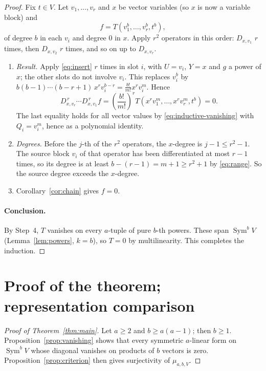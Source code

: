 \documentclass[11pt]{article}
\theoremstyle{remark}
\DeclareMathOperator{\Sym}{Sym}
\newcommand{\D}[2]{D_{#1,#2}}
\begin{document}
\begin{proof}
Fix $t\in V$. Let $v_1,\ldots,v_r$ and $x$ be vector variables (so $x$ is now
a variable block) and
\[
 f=T(v_1^b,\ldots,v_r^b,t^b),
\]
of degree $b$ in each $v_i$ and degree $0$ in $x$. Apply $r^2$ operators in
this order: $\D{x}{v_1}$ $r$ times, then $\D{x}{v_2}$ $r$ times, and so on up
to $\D{x}{v_r}$.
\begin{enumerate}[label=(\alph*),nosep]
\item \emph{Result.} Apply \eqref{eq:insert} $r$ times in slot $i$, with
$U=v_i$, $Y=x$ and $g$ a power of $x$; the other slots do not involve $v_i$.
This replaces $v_i^b$ by
$b(b-1)\cdots(b-r+1)\,x^rv_i^{b-r}=\frac{b!}{m!}x^rv_i^m$. Hence
\begin{equation}\label{eq:second-composition}
 \D{x}{v_r}^{\,r}\cdots\D{x}{v_1}^{\,r}f
 =\left(\frac{b!}{m!}\right)^r
 T(x^rv_1^m,\ldots,x^rv_r^m,t^b)=0.
\end{equation}
The last equality holds for all vector values by
\eqref{eq:inductive-vanishing} with $Q_i=v_i^m$, hence as a polynomial
identity.
\item \emph{Degrees.} Before the $j$-th of the $r^2$ operators, the
$x$-degree is $j-1\le r^2-1$. The source block $v_i$ of that operator has
been differentiated at most $r-1$ times, so its degree is at least
$b-(r-1)=m+1\ge r^2+1$ by \eqref{eq:range}. So the source degree exceeds the
$x$-degree.
\item Corollary~\ref{cor:chain} gives $f=0$.
\end{enumerate}

\paragraph{Conclusion.}
By Step~4, $T$ vanishes on every $a$-tuple of pure $b$-th powers. These span
$\Sym^bV$ (Lemma~\ref{lem:powers}, $k=b$), so $T=0$ by multilinearity. This
completes the induction.
\end{proof}

\section{Proof of the theorem; representation comparison}\label{sec:comparison}

\begin{proof}[Proof of Theorem~\ref{thm:main}]
Let $a\ge2$ and $b\ge a(a-1)$; then $b\ge1$.
Proposition~\ref{prop:vanishing} shows that every symmetric $a$-linear form
on $\Sym^bV$ whose diagonal vanishes on products of $b$ vectors is zero.
Proposition~\ref{prop:criterion} then gives surjectivity of $\mu_{a,b,V}$.
\end{proof}
\end{document}
